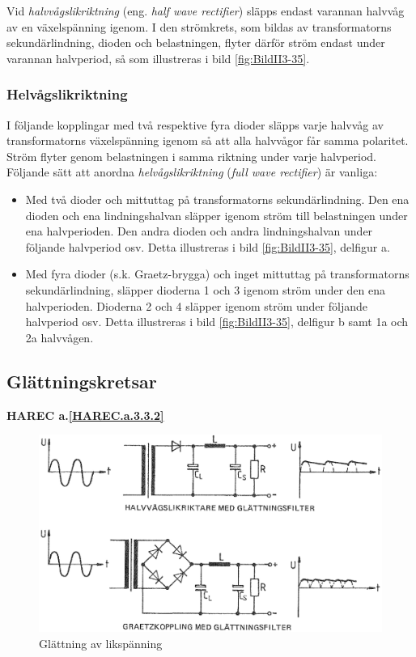Vid \emph{halvvågslikriktning} (eng. \emph{half wave rectifier}) släpps endast
varannan halvvåg av en växelspänning igenom.
I den strömkrets, som bildas av transformatorns sekundärlindning, dioden och
belastningen, flyter därför ström endast under varannan halvperiod, så som
illustreras i bild \ref{fig:BildII3-35}.

\subsubsection{Helvågslikriktning}

I följande kopplingar med två respektive fyra dioder släpps varje halvvåg av
transformatorns växelspänning igenom så att alla halvvågor får samma polaritet.
Ström flyter genom belastningen i samma riktning under varje halvperiod.
Följande sätt att anordna \emph{helvågslikriktning}
(\emph{full wave rectifier}) är vanliga:
\begin{itemize}
\item Med två dioder och mittuttag på transformatorns sekundärlindning.
  Den ena dioden och ena lindningshalvan släpper igenom ström till belastningen
  under ena halvperioden.
  Den andra dioden och andra lindningshalvan under följande halvperiod osv.
  Detta illustreras i bild \ref{fig:BildII3-35}, delfigur a.

\item Med fyra dioder (s.k. Graetz-brygga) och inget mittuttag på
  transformatorns sekundärlindning, släpper dioderna 1 och 3 igenom
  ström under den ena halvperioden.
  Dioderna 2 och 4 släpper igenom ström under följande halvperiod osv.
  Detta illustreras i bild \ref{fig:BildII3-35}, delfigur b samt 1a och 2a
  halvvågen.
\end{itemize}

\subsection{Glättningskretsar}
\textbf{HAREC a.\ref{HAREC.a.3.3.2}\label{myHAREC.a.3.3.2}}

\begin{figure}
\includegraphics[width=\textwidth]{images/cropped_pdfs/bild_2_3-36.pdf}
\caption{Glättning av likspänning}
\label{fig:BildII3-36}
\end{figure}

